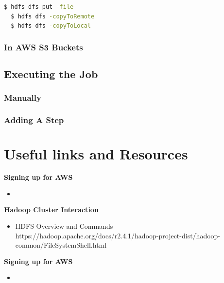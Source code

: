 \documentclass{article}
\begin{document}
\begin{lstlisting}[language=bash]
  $ hdfs dfs put -file 
  $ hdfs dfs -copyToRemote
  $ hdfs dfs -copyToLocal
\end{lstlisting}

\subsubsection{In AWS S3 Buckets}
\subsection{Executing the Job}
\subsubsection{Manually}
\subsubsection{Adding A Step}


\section{Useful links and Resources}
\textbf{Signing up for AWS}
\begin{itemize}
    \item 
\end{itemize}
\textbf{Hadoop Cluster Interaction}
\begin{itemize}
    \item HDFS Overview and Commands\\ https://hadoop.apache.org/docs/r2.4.1/hadoop-project-dist/hadoop-common/FileSystemShell.html
    
\end{itemize}
\textbf{Signing up for AWS}
\begin{itemize}
    \item 
\end{itemize}


%
\end{document}
